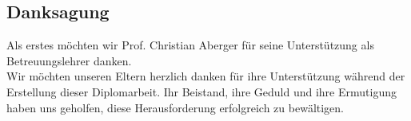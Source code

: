 \begin{spacing}{1}
    \chapter*{Danksagung}
\end{spacing}
Als erstes möchten wir Prof. Christian Aberger
für seine Unterstützung als Betreuungslehrer danken.
\\
Wir möchten unseren Eltern herzlich danken für ihre Unterstützung während 
der Erstellung dieser Diplomarbeit. Ihr Beistand, ihre Geduld und ihre 
Ermutigung haben uns geholfen, diese Herausforderung erfolgreich zu bewältigen.
